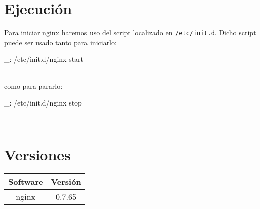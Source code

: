 \section{Ejecución}

Para iniciar nginx haremos uso del script localizado en \texttt{/etc/init.d}. Dicho script puede ser usado tanto para iniciarlo:

\begin{bashcode}
_: /etc/init.d/nginx start
\end{bashcode}
\\

como para pararlo:

\begin{bashcode}
_: /etc/init.d/nginx stop
\end{bashcode}
\\


\section{Versiones}

\begin{tabular}{|c|c|}
   \hline
   Software & Versión \\ \hline
   nginx & 0.7.65 \\ \hline
\end{tabular}
